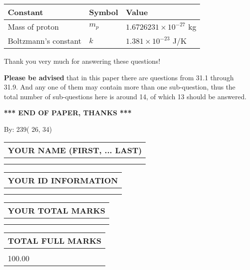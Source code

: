 \documentclass[12pt]{article}
\begin{document}
 
\noindent\begin{tabular}{|l|l|l|}
\hline
Constant & Symbol & Value \\
\hline
 
Mass of proton &
$m_p$ &
 $ 1.6726231 \times 10^{-27} $
kg \\
\hline
 
Boltzmann's constant &
$k$ &
 $ 1.381 \times 10^{-23} $
J/K \\
\hline
 
\end{tabular}
 
Thank you very much for answering these questions!
 
{\textbf{\large{Please be advised}}} that in this paper there are questions from
31.1 through
31.9.
And any one of them may contain more than one sub-question, thus the total number
of sub-questions here is around 14, of which
13 should be answered.
 
   
   
   
   
\vspace{1.0in} 
{\textbf{\large{ *** END OF PAPER, THANKS *** }}} 
   
   
\hspace{1.0in} By: 
         239(         26,          34)
   
   
   
   
\newpage 
\setcounter{page}{ 
    32001 } 
   
   
   
   
\noindent\begin{tabular}{|l|}
\hline
YOUR NAME (FIRST, ... LAST)  \\
\hline
 \\ 
 \\ 
\hline
\end{tabular}
\hspace{0.05in} \begin{tabular}{|l|}
\hline
 YOUR   ID   INFORMATION  \\
\hline
 \\ 
 \\ 
\hline
\end{tabular}
   
   
\vspace{0.2in}\noindent\begin{tabular}{|l|}
\hline
YOUR TOTAL MARKS  \\
\hline
 \\ 
 \\ 
\hline
\end{tabular}
\hspace{0.05in} \begin{tabular}{|l|}
\hline
TOTAL FULL MARKS  \\
\hline
 \\ 
100.00 \\
\hline
\end{tabular}
   
\end{document}
